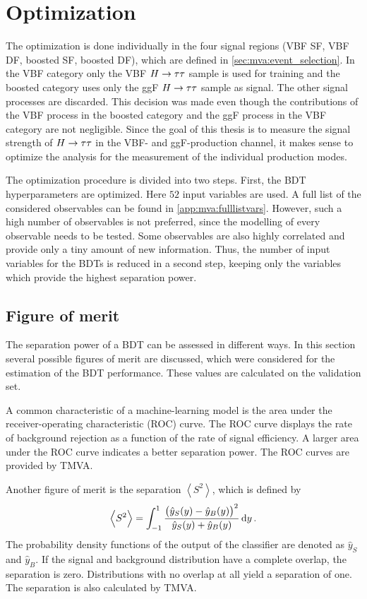 \section{Optimization}\label{sec:mva:optimization}

The optimization is done individually in the four signal regions (VBF SF, VBF DF, boosted SF, boosted DF), which are defined in \cref{sec:mva:event_selection}.
In the VBF category only the VBF $H \to \tau \tau$ sample is used for training and the boosted category uses only the ggF $H \to \tau \tau$ sample as signal.
The other signal processes are discarded.
This decision was made even though the contributions of the VBF process in the boosted category and
the ggF process in the VBF category are not negligible.
Since the goal of this thesis is to measure the signal strength of $H \to \tau \tau$ in the VBF- and ggF-production channel,
it makes sense to optimize the analysis for the measurement of the individual production modes.

The optimization procedure is divided into two steps.
First, the BDT hyperparameters are optimized. Here $52$ input variables are used. A full list of the considered observables can be found in \cref{app:mva:fulllistvars}.
However, such a high number of observables is not preferred, since the modelling of every observable needs to be tested.
Some observables are also highly correlated and provide only a tiny amount of new information.
Thus, the number of input variables for the BDTs is reduced in a second step, keeping only the variables which provide
the highest separation power.

\subsection{Figure of merit}\label{sub:mva:optimization:fom}

The separation power of a BDT can be assessed in different ways.
In this section several possible figures of merit are discussed,
which were considered for the estimation of the BDT performance.
These values are calculated on the validation set.

A common characteristic of a machine-learning model is the area under the receiver-operating characteristic (ROC) curve.
The ROC curve displays the rate of background rejection as a function of the rate of signal efficiency.
A larger area under the ROC curve indicates a better separation power.
The ROC curves are provided by TMVA\@.

Another figure of merit is the separation $\left<S^2\right>$, which is defined by~\cite{TMVA}
\begin{equation}
    \left<S^2\right> = \int_{-1}^1 \frac{{\left(\hat{y}_S(y) - \hat{y}_B(y)\right)}^2}{\hat{y}_S(y) + \hat{y}_B(y)} \dif y \,.
\end{equation}
The probability density functions of the output of the classifier are denoted as $\hat{y}_S$ and $\hat{y}_B$.
If the signal and background distribution have a complete overlap, the separation is zero.
Distributions with no overlap at all yield a separation of one.
The separation is also calculated by TMVA\@.

